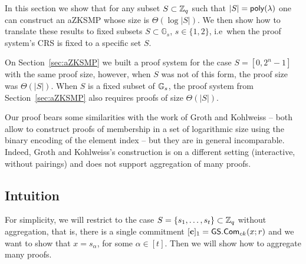 \newcommand{\setsize}{t}

In this section we show that for any subset \(S\subset\mathbb{Z}_q\) such that \(|S|=\mathsf{poly}(\lambda)\) one can construct an aZKSMP whose size is \(\Theta(\log|S|)\). We then show how to translate these results to fixed subsets \(S\subset\mathbb{G}_s\), \(s\in\{1,2\}\), i.e~when the proof system's CRS is fixed to a specific set \(S\).

On Section~\ref{sec:aZKSMP} we built a proof system for the case \(S=[0,2^n-1]\) with the same proof size, however, when \(S\) was not of this form, the proof size was \(\Theta(|S|)\). When \(S\) is a fixed subset of \(\mathbb{G}_s\), the proof system from Section~\ref{sec:aZKSMP} also requires proofs of size \(\Theta(|S|)\).

Our proof bears some similarities with the work of Groth and Kohlweiss \cite{EC:GroKoh15} -- both allow to construct proofs of membership in a set of logarithmic size using the binary encoding of the element index -- but they are in general incomparable. Indeed, Groth and Kohlweiss's construction is on a different setting (interactive, without pairings) and does not support aggregation of many proofs.

\subsection{Intuition}

For simplicity, we will restrict to the case \(S=\{s_1,\ldots,s_\setsize \}\subset\Z_q\) without aggregation, that is, there is a single commitment \([\mathbf{c}]_1={\mathsf{GS}}.\mathsf{Com}_{ck}(x;r)\) and we want to show that \(x=s_\alpha\), for some \(\alpha\in[\setsize ]\). Then we will show how to aggregate many proofs.

